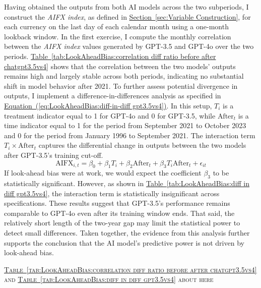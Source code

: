 \documentclass[12pt,oneside,letter]{article}
\newcommand*{\mytab}[1]{\hyperref[{#1}]{Table~\ref*{#1}}}
\newcommand*{\mysec}[1]{\hyperref[{#1}]{Section~\ref*{#1}}}
\newcommand*{\myeq}[1]{\hyperref[{#1}]{Equation~(\ref*{#1})}}
\begin{document}
		\vspace{-20pt}Having obtained the outputs from both AI models across the two subperiods, I construct the \textit{AIFX index}, as defined in \mysec{sec:Variable Construction}, for each currency on the last day of each calendar month using a one-month lookback window. In the first exercise, I compute the monthly correlation between the \textit{AIFX index} values generated by GPT-3.5 and GPT-4o over the two periods. \mytab{tab:LookAheadBias:correlation diff ratio before after chatgpt3.5vs4} shows that the correlation between the two models' outputs remains high and largely stable across both periods, indicating no substantial shift in model behavior after 2021. To further assess potential divergence in outputs, I implement a difference-in-differences analysis as specified in \myeq{eq:LookAheadBias:diff-in-diff gpt3.5vs4}. In this setup, \(T_i\) is a treatment indicator equal to 1 for GPT-4o and 0 for GPT-3.5, while \(\text{After}_t\) is a time indicator equal to 1 for the period from September 2021 to October 2023 and 0 for the period from January 1996 to September 2021. The interaction term \(T_i \times \text{After}_t\) captures the differential change in outputs between the two models after GPT-3.5’s training cut-off.
		\begin{equation}
			\text{AIFX}_{i,t} = \beta_0 + \beta_1 T_i + \beta_2 \text{After}_t + \beta_3 T_i \text{After}_t + \epsilon_{it}
			\label{eq:LookAheadBias:diff-in-diff gpt3.5vs4}
		\end{equation}
		If look-ahead bias were at work, we would expect the coefficient \(\beta_3\) to be statistically significant. However, as shown in \mytab{tab:LookAheadBias:diff in diff gpt3.5vs4}, the interaction term is statistically insignificant across specifications. These results suggest that GPT-3.5’s performance remains comparable to GPT-4o even after its training window ends. That said, the relatively short length of the two-year gap may limit the statistical power to detect small differences. Taken together, the evidence from this analysis further supports the conclusion that the AI model's predictive power is not driven by look-ahead bias.
		\begin{center}
			\textsc{\mytab{tab:LookAheadBias:correlation diff ratio before after chatgpt3.5vs4} and \mytab{tab:LookAheadBias:diff in diff gpt3.5vs4} about here} \vspace{0cm}
		\end{center} 
\end{document}
